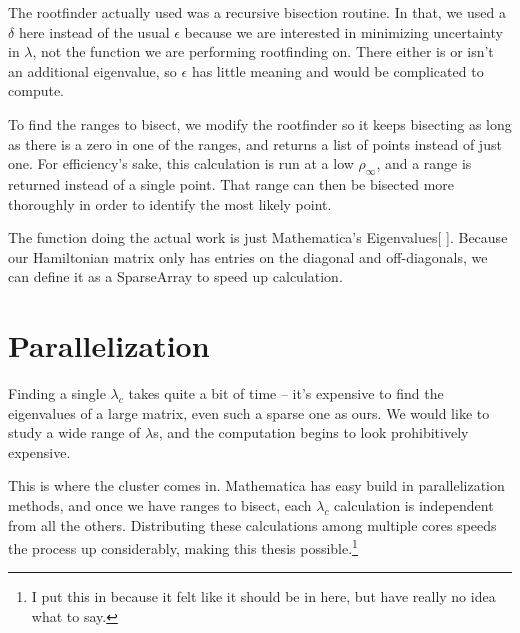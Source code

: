 \documentclass[12pt,twoside]{reedthesis}
\begin{document}
The rootfinder actually used was a recursive bisection routine. In that, we used a $\delta$ here instead of the usual $\epsilon$ because we are interested in minimizing uncertainty in $\lambda$, not the function we are performing rootfinding on. There either is or isn't an additional eigenvalue, so $\epsilon$ has little meaning and would be complicated to compute.

To find the ranges to bisect, we modify the rootfinder so it keeps bisecting as long as there is a zero in one of the ranges, and returns a list of points instead of just one. For efficiency's sake, this calculation is run at a low $\rho_{\infty}$, and a range is returned instead of a single point. That range can then be bisected more thoroughly in order to identify the most likely point. 

The function doing the actual work is just Mathematica's Eigenvalues[ ]. Because our Hamiltonian matrix only has entries on the diagonal and off-diagonals, we can define it as a SparseArray to speed up calculation. 

\section{Parallelization}

Finding a single $\lambda_{c}$ takes quite a bit of time -- it's expensive to find the eigenvalues of a large matrix, even such a sparse one as ours. We would like to study a wide range of $\lambda$s, and the computation begins to look prohibitively expensive.

This is where the cluster comes in. Mathematica has easy build in parallelization methods, and once we have ranges to bisect, each $\lambda_{c}$ calculation is independent from all the others. Distributing these calculations among multiple cores speeds the process up considerably, making this thesis possible.\footnote{I put this in because it felt like it should be in here, but have really no idea what to say.}


%
%
%
\backmatter %
%

 
  
%
   \nocite{*}
   

\end{document}
